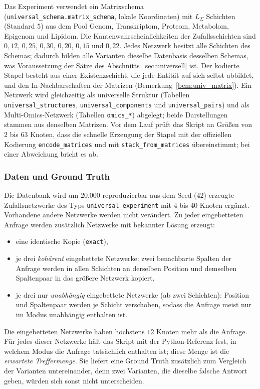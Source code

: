 Das Experiment verwendet ein Matrixschema (\texttt{universal\_schema.matrix\_schema}, lokale Koordinaten) mit $L_\Sigma$ Schichten (Standard $5$) aus dem Pool Genom, Transkriptom, Proteom, Metabolom, Epigenom und Lipidom. Die Kantenwahrscheinlichkeiten der Zufallsschichten sind $0{,}12$, $0{,}25$, $0{,}30$, $0{,}20$, $0{,}15$ und $0{,}22$. Jedes Netzwerk besitzt alle Schichten des Schemas; dadurch bilden alle Varianten dieselbe Datenbasis desselben Schemas, was Voraussetzung der Sätze des Abschnitts~\ref{sec:universell} ist. Der kodierte Stapel besteht aus einer Existenzschicht, die jede Entität auf sich selbst abbildet, und den In-Nachbarschaften der Matrizen (Bemerkung~\ref{bem:univ_matrix}). Ein Netzwerk wird gleichzeitig als universelle Struktur (Tabellen \texttt{universal\_structures}, \texttt{universal\_components} und \texttt{universal\_pairs}) und als Multi-Omics-Netzwerk (Tabellen \texttt{omics\_*}) abgelegt; beide Darstellungen stammen aus denselben Matrizen. Vor dem Lauf prüft das Skript an Größen von $2$ bis $63$ Knoten, dass die schnelle Erzeugung der Stapel mit der offiziellen Kodierung \texttt{encode\_matrices} und mit \texttt{stack\_from\_matrices} übereinstimmt; bei einer Abweichung bricht es ab.

\subsubsection{Daten und Ground Truth}

Die Datenbank wird um $20.000$ reproduzierbar aus dem Seed ($42$) erzeugte Zufallsnetzwerke des Typs \texttt{universal\_experiment} mit $4$ bis $40$ Knoten ergänzt. Vorhandene andere Netzwerke werden nicht verändert. Zu jeder eingebetteten Anfrage werden zusätzlich Netzwerke mit bekannter Lösung erzeugt:
\begin{itemize}
	\item eine identische Kopie (\texttt{exact}),
	\item je drei \emph{kohärent} eingebettete Netzwerke: zwei benachbarte Spalten der Anfrage werden in allen Schichten an derselben Position und demselben Spaltenpaar in das größere Netzwerk kopiert,
	\item je drei nur \emph{unabhängig} eingebettete Netzwerke (ab zwei Schichten): Position und Spaltenpaar werden je Schicht verschoben, sodass die Anfrage meist nur im Modus unabhängig enthalten ist.
\end{itemize}
Die eingebetteten Netzwerke haben höchstens $12$ Knoten mehr als die Anfrage. Für jedes dieser Netzwerke hält das Skript mit der Python-Referenz fest, in welchem Modus die Anfrage tatsächlich enthalten ist; diese Menge ist die \emph{erwartete Treffermenge}. Sie liefert eine Ground Truth zusätzlich zum Vergleich der Varianten untereinander, denn zwei Varianten, die dieselbe falsche Antwort geben, würden sich sonst nicht unterscheiden.

